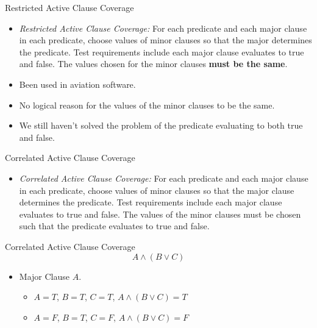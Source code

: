 \documentclass{beamer}
\begin{document}
\begin{frame}{Restricted Active Clause Coverage}
  \begin{itemize}
  \item {\em Restricted Active Clause Coverage:} For each predicate
    and each major clause in each predicate, choose values of minor
    clauses so that the major determines the predicate. Test
    requirements include each major clause evaluates to true and
    false. The values chosen for the minor clauses {\bf must be the
      same}.
  \item Been used in aviation software. 
  \item No logical reason for the values of the minor clauses to be
    the same. 
  \item We still haven't solved the problem of the predicate
    evaluating to both true and false.
  \end{itemize}
  
\end{frame}
\begin{frame}{Correlated Active Clause Coverage}
  \begin{itemize}
  \item {\em Correlated Active Clause Coverage:} For each predicate
    and each major clause in each predicate, choose values of minor
    clauses so that the major clause determines the predicate. Test
    requirements include each major clause evaluates to true and
    false. The values of the minor clauses must be chosen such that
    the predicate evaluates to true and false.
  \end{itemize}
\end{frame}
\begin{frame}{Correlated Active Clause Coverage}
  \[
   A \land (B \lor C)
  \]
  \begin{itemize}
  \item Major Clause $A$.
    \begin{itemize}
    \item $A=T$, $B=T$, $C=T$, $A\land (B\lor C)=T$
    \item $A=F$, $B=T$, $C=F$, $A\land (B\lor C)=F$
    \end{itemize}
  \end{itemize}
\end{frame}
\end{document}
